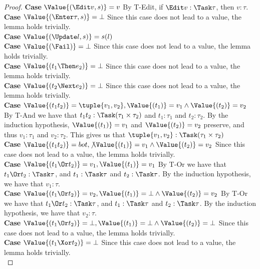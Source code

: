 \begin{proof}
  \noindent\textbf{Case} $\Value{(\Edit v,s)}=v$ By T-Edit, if $\Edit v:\Task\tau$, then $v:\tau$.\\

  \noindent\textbf{Case} $\Value{(\Enter \tau,s)}=\bot$ Since this case does not lead to a value, the lemma holds trivially.\\

  \noindent\textbf{Case} $\Value{(\Update l,s)}=s(l)$ \\

  \noindent\textbf{Case} $\Value{(\Fail)}=\bot$ Since this case does not lead to a value, the lemma holds trivially.\\

  \noindent\textbf{Case} $\Value{(t_1\Then e_2)}=\bot$ Since this case does not lead to a value, the lemma holds trivially.\\

  \noindent\textbf{Case} $\Value{(t_2\Next e_2)}=\bot$ Since this case does not lead to a value, the lemma holds trivially.\\

  \noindent\textbf{Case} $\Value{(t_1\And t_2)}=\tuple{v_1, v_2}, \Value{(t_1)}=v_1\wedge\Value{(t_2)}=v_2$ By T-And we have that $t_1\And t_2:\Task(\tau_1\times\tau_2)$ and $t_1:\tau_1$ and $t_2:\tau_2$. By the induction hypothesis, $ \Value{(t_1)}=v_1$ and $\Value{(t_2)}=v_2$ preserve, and thus $v_1:\tau_1$ and $v_2:\tau_2$. This gives us that $\tuple{v_1, v_2}:\Task(\tau_1\times\tau_2)$ \\

  \noindent\textbf{Case} $\Value{(t_1\And t_2)}=bot, \not\Value{(t_1)}=v_1\wedge\Value{(t_2)}=v_2$ Since this case does not lead to a value, the lemma holds trivially.\\

  \noindent\textbf{Case} $\Value{(t_1\Or t_2)}=v_1, \Value{(t_1)}=v_1$ By T-Or we have that $t_1\Or t_2:\Task\tau$, and $t_1:\Task\tau$ and $t_2:\Task\tau$. By the induction hypothesis, we have that $v_1:\tau$.\\

  \noindent\textbf{Case} $\Value{(t_1\Or t_2)}=v_2, \Value{(t_1)}=\bot\wedge\Value{(t_2)}=v_2$ By T-Or we have that $t_1\Or t_2:\Task\tau$, and $t_1:\Task\tau$ and $t_2:\Task\tau$. By the induction hypothesis, we have that $v_2:\tau$.\\

  \noindent\textbf{Case} $\Value{(t_1\Or t_2)}=\bot, \Value{(t_1)}=\bot\wedge\Value{(t_2)}=\bot$ Since this case does not lead to a value, the lemma holds trivially.\\

  \noindent\textbf{Case} $\Value{(t_1\Xor t_2)}=\bot$ Since this case does not lead to a value, the lemma holds trivially.\\
\end{proof}

